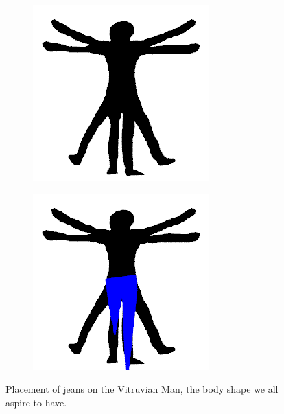 \documentclass[twocolumn]{article}
\begin{document}
\begin{figure}
    \begin{subfigure}{0.23\textwidth}
        \includegraphics[width=0.92\linewidth]{img/vitruvian/target.png}
    \end{subfigure}
    \begin{subfigure}{0.23\textwidth}
        \includegraphics[width=0.92\linewidth]{img/vitruvian/iter_99.png}
    \end{subfigure}
    \caption{Placement of jeans on the Vitruvian Man, the body shape we all aspire to have.}
    \label{fig:vitruvian}
\end{figure}
\end{document}
